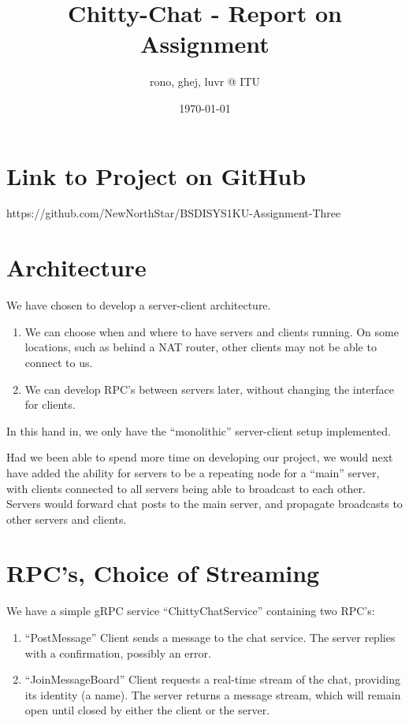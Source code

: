 \documentclass[a4paper,11pt]{article}
\title{Chitty-Chat - Report on Assignment}
\author{rono, ghej, luvr @ ITU}
\date{\today}
\begin{document}
\maketitle

\tableofcontents

\pagebreak

\section{Link to Project on GitHub}
https://github.com/NewNorthStar/BSDISYS1KU-Assignment-Three

\section{Architecture}

We have chosen to develop a server-client architecture. 

\begin{enumerate}
    \item We can choose when and where to have servers and clients running. On some locations, such as behind a NAT router, other clients may not be able to connect to us. 
    \item We can develop RPC's between servers later, without changing the interface for clients. 
\end{enumerate}

In this hand in, we only have the ``monolithic'' server-client setup implemented. 

\bigbreak

Had we been able to spend more time on developing our project, we would next have added the ability for servers to be a repeating node for a ``main'' server, with clients connected to all servers being able to broadcast to each other. Servers would forward chat posts to the main server, and propagate broadcasts to other servers and clients. 

\section{RPC's, Choice of Streaming}
We have a simple gRPC service ``ChittyChatService'' containing two RPC's:

\begin{enumerate}
    \item ``PostMessage'' Client sends a message to the chat service. The server replies with a confirmation, possibly an error. 
    \item ``JoinMessageBoard'' Client requests a real-time stream of the chat, providing its identity (a name). The server returns a message stream, which will remain open until closed by either the client or the server. 
\end{enumerate}
\end{document}
